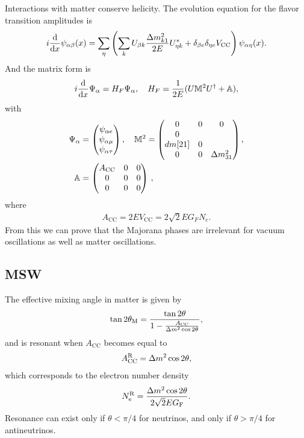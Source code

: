 \documentclass[twocolumn]{article}
\begin{document}
Interactions with matter conserve helicity. 
The evolution equation for the flavor transition amplitudes is 
\begin{align*}
  i \dv{}{x}\psi_{\a \b}(x) = \sum_\eta \left( \sum_k U_{\b k} \frac{\dm_{k1}}{2E} U^*_{\eta k} + \delta _{\b e} \delta_{\eta e} V_\text{CC} \right) \psi_{\alpha \eta}(x)
.\end{align*}
And the matrix form is
\begin{align*}
  i \dv{}{x} \Psi_{\alpha} = H_F \Psi_{\alpha}, \quad H_F = \frac{1}{2E}(U \mathbb{M}^2 U^\dagger + \mathbb{A})
,\end{align*}
with
\begin{align*}
  \Psi_\a &= \begin{pmatrix} \psi_{\a e} \\ \psi_{\a \mu} \\ \psi_{\a \tau} \end{pmatrix} , \quad
  \mathbb{M}^2 = \begin{pmatrix} 0 & 0 & 0 \\
                                 0 & \\dm[21] & 0 \\
                                 0 & 0 & \dm_{31}
                 \end{pmatrix}, \\
    \mathbb{A} &= \begin{pmatrix} A_\text{CC} & 0 & 0 \\
                                 0 & 0 & 0 \\
                                 0 & 0 & 0
                 \end{pmatrix}
\,,\end{align*}
where 
\begin{align*}
  A_\text{CC} = 2EV_\text{CC} = 2 \sqrt{2}E G_F N_e 
.\end{align*}
From this we can prove that the Majorana phases are irrelevant for vacuum oscillations as well as matter oscillations.

\subsection*{MSW}
The effective mixing angle in matter is given by
\begin{align*}
\tan 2\theta_\t{M} = \frac{\tan 2\theta}{1- \frac{A_\text{CC}}{\dm \cos 2\theta}}
,\end{align*}
and is resonant when $A_\text{CC}$ becomes equal to
\begin{align*}
  A^\t{R}_\t{CC} = \dm \cos 2\theta
,\end{align*}
which corresponds to the electron number density
\begin{align*}
  N^\t{R}_\t{e} = \frac{\dm \cos 2\theta}{2\sqrt{2} E G_\t{F} }
.\end{align*}
Resonance can exist only if $\theta < \pi / 4$ for neutrinos, and only if $\theta > \pi / 4$ for antineutrinos. 
\end{document}
